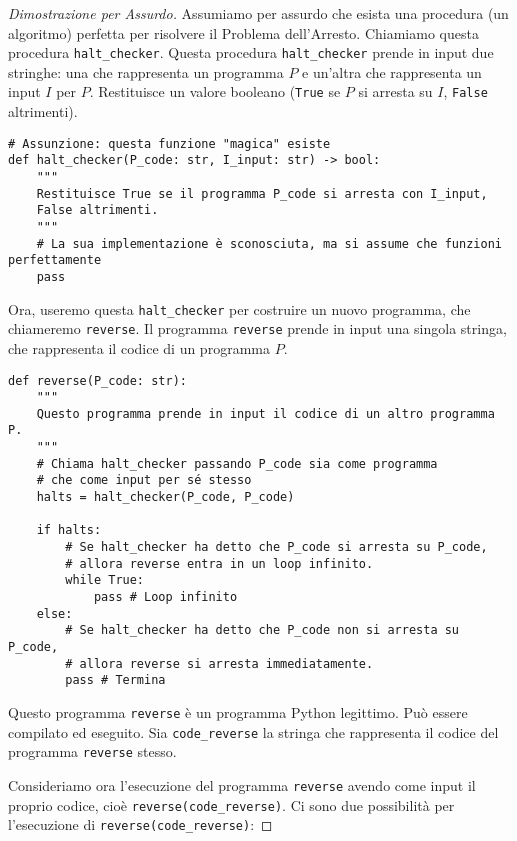 \documentclass[a4paper, 11pt]{book} %
\theoremstyle{definition}
\begin{document}
\begin{proof}[Dimostrazione per Assurdo]
Assumiamo per assurdo che esista una procedura (un algoritmo) perfetta per risolvere il Problema dell'Arresto. Chiamiamo questa procedura \texttt{halt\_checker}.
Questa procedura \texttt{halt\_checker} prende in input due stringhe: una che rappresenta un programma $P$ e un'altra che rappresenta un input $I$ per $P$. Restituisce un valore booleano (\texttt{True} se $P$ si arresta su $I$, \texttt{False} altrimenti).

\begin{verbatim}
# Assunzione: questa funzione "magica" esiste
def halt_checker(P_code: str, I_input: str) -> bool:
    """
    Restituisce True se il programma P_code si arresta con I_input,
    False altrimenti.
    """
    # La sua implementazione è sconosciuta, ma si assume che funzioni perfettamente
    pass
\end{verbatim}

Ora, useremo questa \texttt{halt\_checker} per costruire un nuovo programma, che chiameremo \texttt{reverse}. Il programma \texttt{reverse} prende in input una singola stringa, che rappresenta il codice di un programma $P$.

\begin{verbatim}
def reverse(P_code: str):
    """
    Questo programma prende in input il codice di un altro programma P.
    """
    # Chiama halt_checker passando P_code sia come programma
    # che come input per sé stesso
    halts = halt_checker(P_code, P_code)

    if halts:
        # Se halt_checker ha detto che P_code si arresta su P_code,
        # allora reverse entra in un loop infinito.
        while True:
            pass # Loop infinito
    else:
        # Se halt_checker ha detto che P_code non si arresta su P_code,
        # allora reverse si arresta immediatamente.
        pass # Termina
\end{verbatim}

Questo programma \texttt{reverse} è un programma Python legittimo. Può essere compilato ed eseguito.
Sia \texttt{code\_reverse} la stringa che rappresenta il codice del programma \texttt{reverse} stesso.

Consideriamo ora l'esecuzione del programma \texttt{reverse} avendo come input il proprio codice, cioè \texttt{reverse(code\_reverse)}.
Ci sono due possibilità per l'esecuzione di \texttt{reverse(code\_reverse)}:


\end{proof}
\end{document}
